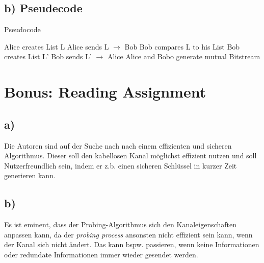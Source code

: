 \documentclass[12pt,a4paper]{article}
\begin{document}
\subsection*{b) Pseudecode}
\begin{algorithm}
\caption{Pseudocode}
\begin{algorithmic}[1]
\State Alice creates List L
\State Alice sends L $\to$ Bob
\State Bob compares L to his List
\State Bob creates List L'
\State Bob sends L' $\to$ Alice
\State Alice and Bobo generate mutual Bitstream
\end{algorithmic}
\end{algorithm}

\newpage
\section{Bonus: Reading Assignment}
\subsection*{a)}
Die Autoren sind auf der Suche nach nach einem effizienten und sicheren Algorithmus. Dieser soll den kabellosen Kanal möglichst effizient nutzen und soll Nutzerfreundlich sein, indem er z.b. einen sicheren Schlüssel in kurzer Zeit generieren kann.

\subsection*{b)}
Es ist eminent, dass der Probing-Algorithmus sich den Kanaleigenschaften anpassen kann, da der \textit{probing process} ansonsten nicht effizient sein kann, wenn der Kanal sich nicht ändert. Das kann bspw. passieren, wenn keine Informationen oder redundate Informationen immer wieder gesendet werden.

\end{document}
